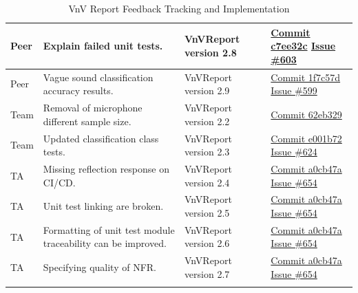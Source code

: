 \documentclass{article}
\begin{document}
\begin{longtable}{|p{2cm}|p{4cm}|p{4cm}|p{3cm}|}
    Peer &
    Explain failed unit tests. &
    VnVReport version 2.8 & 
    \href{https://github.com/Team6-SixSense/audio360/commit/c7ee32c}{Commit
        c7ee32c}
    \newline
    \href{https://github.com/Team6-SixSense/audio360/issues/603}{Issue \#603} \\
    \hline

    Peer &
    Vague sound classification accuracy results. &
    VnVReport version 2.9 & 
    \href{https://github.com/Team6-SixSense/audio360/commit/1f7c57d}{Commit
        1f7c57d}
    \newline
    \href{https://github.com/Team6-SixSense/audio360/issues/599}{Issue \#599} \\
    \hline

    Team &
    Removal of microphone different sample size. &
    VnVReport version 2.2 & 
    \href{https://github.com/Team6-SixSense/audio360/commit/62eb329}{Commit
        62eb329} \\
    \hline

    Team &
    Updated classification class tests. &
    VnVReport version 2.3 & 
    \href{https://github.com/Team6-SixSense/audio360/commit/e001b72}{Commit
        e001b72}
    \newline
    \href{https://github.com/Team6-SixSense/audio360/issues/624}{Issue \#624} \\
    \hline

    TA &
    Missing reflection response on CI/CD. &
    VnVReport version 2.4 & 
    \href{https://github.com/Team6-SixSense/audio360/commit/a0cb47a}{Commit
        a0cb47a}
    \newline
    \href{https://github.com/Team6-SixSense/audio360/issues/654}{Issue \#654} \\
    \hline

    TA &
    Unit test linking are broken. &
    VnVReport version 2.5 & 
    \href{https://github.com/Team6-SixSense/audio360/commit/a0cb47a}{Commit
        a0cb47a}
    \newline
    \href{https://github.com/Team6-SixSense/audio360/issues/654}{Issue \#654} \\
    \hline

    TA &
    Formatting of unit test module traceability can be improved. &
    VnVReport version 2.6 & 
    \href{https://github.com/Team6-SixSense/audio360/commit/a0cb47a}{Commit
        a0cb47a}
    \newline
    \href{https://github.com/Team6-SixSense/audio360/issues/654}{Issue \#654} \\
    \hline

    TA &
    Specifying quality of NFR. &
    VnVReport version 2.7 & 
    \href{https://github.com/Team6-SixSense/audio360/commit/a0cb47a}{Commit
        a0cb47a}
    \newline
    \href{https://github.com/Team6-SixSense/audio360/issues/654}{Issue \#654} \\
    \hline

    \caption{VnV Report Feedback Tracking and Implementation}
\end{longtable}
\end{document}
